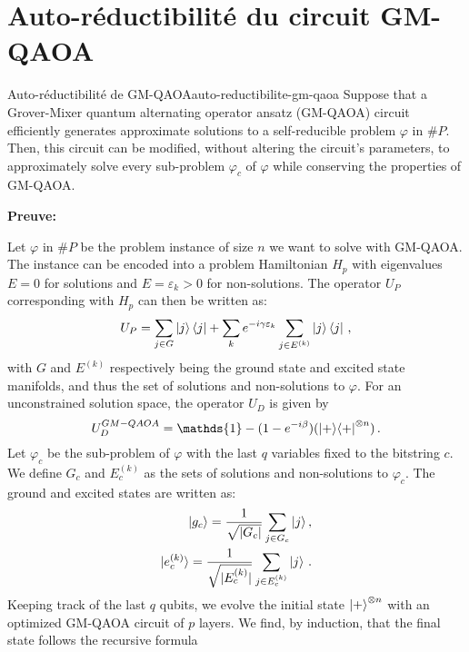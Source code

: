 \begin{comment}
\end{comment}


\chapter{Auto-réductibilité du circuit GM-QAOA}


\begin{maintheorem}{Auto-réductibilité de GM-QAOA}{auto-reductibilite-gm-qaoa}
    Suppose that a Grover-Mixer quantum alternating operator ansatz (GM-QAOA) circuit efficiently generates approximate solutions to a self-reducible problem $\varphi$ in $\#P$. Then, this circuit can be modified, without altering the circuit's parameters, to approximately solve every sub-problem $\varphi_{c}$ of $\varphi$ while conserving the properties of GM-QAOA. 
\end{maintheorem}

\noindent
\textbf{Preuve:} 

Let $\varphi$ in $\#P$ be the problem instance of size $n$ we want to solve  with GM-QAOA. The instance can be encoded into a problem Hamiltonian $H_{p}$ with eigenvalues $E=0$ for solutions and $E=\varepsilon_{k}>0$ for non-solutions. The operator $U_{P}$ corresponding with $H_{p}$ can then be written as:
\begin{equation}
    U_{P} = \sum_{j \in G} \ket{j}\bra{j} + \sum_{k} e^{-i \gamma \varepsilon_{k}} \sum_{j \in E^{(k)}} \ket{j}\bra{j} \,,
\end{equation} 
with $G$ and $E^{(k)}$ respectively being the ground state and excited state manifolds, and thus the set of solutions and non-solutions to $\varphi$. For an unconstrained solution space, the operator $U_{D}$ is given by
\begin{equation}
    U_{D}^{GM-QAOA} = \mathds{1} - (1 - e^{-i\beta}) (\ket{+}\!\bra{+}^{\otimes n}) \,.
\end{equation}
Let $\varphi_{c}$ be the sub-problem of $\varphi$ with the last $q$ variables fixed to the bitstring $c$. We define $G_{c}$ and $E_{c}^{(k)}$ as the sets of solutions and non-solutions to $\varphi_{c}$. The ground and excited states are written as:
\begin{align}
    \ket{g_{c}} = \frac{1}{\sqrt{ \lvert G_{c} \rvert }} \sum_{j \in G_{c}} \ket{j}, \\
    \ket{e^{(k)}_{c}} = \frac{1}{\sqrt{ \lvert E^{(k)}_{c} \rvert }} \sum_{j \in E^{(k)}_{c}} \ket{j} \,.
\end{align}
Keeping track of the last $q$ qubits, we evolve the initial state $\ket{+}^{\otimes n}$ with an optimized GM-QAOA circuit of $p$ layers. We find, by induction, that the final state follows the recursive formula

